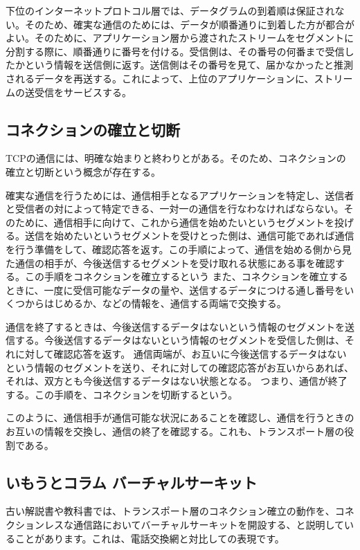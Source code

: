 下位のインターネットプロトコル層では、データグラムの到着順は保証されない。そのため、確実な通信のためには、データが順番通りに到着した方が都合がよい。そのために、アプリケーション層から渡されたストリームをセグメントに分割する際に、順番通りに番号を付ける。受信側は、その番号の何番まで受信したかという情報を送信側に返す。送信側はその番号を見て、届かなかったと推測されるデータを再送する。これによって、上位のアプリケーションに、ストリームの送受信をサービスする。


\subsection{コネクションの確立と切断}

TCPの通信には、明確な始まりと終わりとがある。そのため、コネクションの確立と切断という概念が存在する。

確実な通信を行うためには、通信相手となるアプリケーションを特定し、送信者と受信者の対によって特定できる、一対一の通信を行なわなければならない。そのために、通信相手に向けて、これから通信を始めたいというセグメントを投げる。送信を始めたいというセグメントを受けとった側は、通信可能であれば通信を行う準備をして、確認応答を返す。この手順によって、通信を始める側から見た通信の相手が、今後送信するセグメントを受け取れる状態にある事を確認する。この手順をコネクションを確立するという
また、コネクションを確立するときに、一度に受信可能なデータの量や、送信するデータにつける通し番号をいくつからはじめるか、などの情報を、通信する両端で交換する。

通信を終了するときは、今後送信するデータはないという情報のセグメントを送信する。今後送信するデータはないという情報のセグメントを受信した側は、それに対して確認応答を返す。
通信両端が、お互いに今後送信するデータはないという情報のセグメントを送り、それに対しての確認応答がお互いからあれば、それは、双方とも今後送信するデータはない状態となる。
つまり、通信が終了する。この手順を、コネクションを切断するという。

このように、通信相手が通信可能な状況にあることを確認し、通信を行うときのお互いの情報を交換し、通信の終了を確認する。これも、トランスポート層の役割である。

\subsection*{いもうとコラム バーチャルサーキット}

古い解説書や教科書では、トランスポート層のコネクション確立の動作を、コネクションレスな通信路においてバーチャルサーキットを開設する、と説明していることがあります。これは、電話交換網と対比しての表現です。

